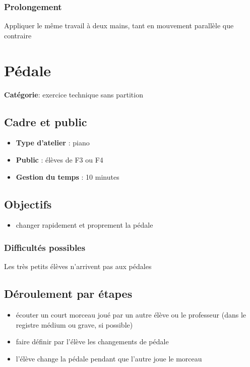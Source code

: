\documentclass[a4paper,11pt,bibliography=totoc,numbers=noenddot,listof=flat,DIV=11,BCOR=0mm]{scrreprt}%
\begin{document}
\subsection*{Prolongement}
Appliquer le même travail à deux mains, tant en mouvement parallèle que contraire


\chapter[Exercice technique sans partition: Pédale]{Pédale}

{\large \textbf{Catégorie}}:
 exercice technique sans partition


\section*{Cadre et public}
\begin{itemize}
\item [\textbullet]\textbf{Type d'atelier} : piano

\item [\textbullet]\textbf{Public} : élèves de F3 ou F4

\item [\textbullet]\textbf{Gestion du temps} : 10 minutes

\end{itemize}

\section*{Objectifs}
\begin{itemize}
\item changer rapidement et proprement la pédale
\end{itemize}

\subsection*{Difficultés possibles}
Les très petits élèves n'arrivent pas aux pédales

\section*{Déroulement par étapes}
\begin{itemize}
\item écouter un court morceau joué par un autre élève ou le professeur (dans le registre médium ou grave, si possible)
\item faire définir par l'élève les changements de pédale
\item l'élève change la pédale pendant que l'autre joue le morceau
\end{itemize}
\end{document}
